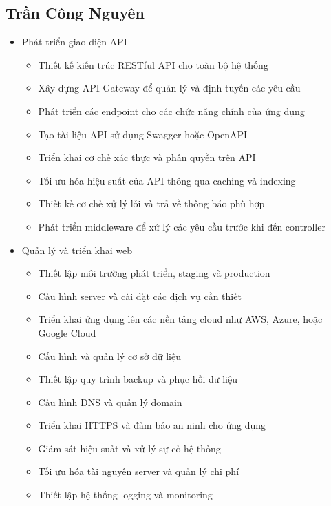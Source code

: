 \subsection{Trần Công Nguyên}
\begin{itemize}
    \item Phát triển giao diện API
    \begin{itemize}
        \item Thiết kế kiến trúc RESTful API cho toàn bộ hệ thống
        \item Xây dựng API Gateway để quản lý và định tuyến các yêu cầu
        \item Phát triển các endpoint cho các chức năng chính của ứng dụng
        \item Tạo tài liệu API sử dụng Swagger hoặc OpenAPI
        \item Triển khai cơ chế xác thực và phân quyền trên API
        \item Tối ưu hóa hiệu suất của API thông qua caching và indexing
        \item Thiết kế cơ chế xử lý lỗi và trả về thông báo phù hợp
        \item Phát triển middleware để xử lý các yêu cầu trước khi đến controller
    \end{itemize}
    
    \item Quản lý và triển khai web
    \begin{itemize}
        \item Thiết lập môi trường phát triển, staging và production
        \item Cấu hình server và cài đặt các dịch vụ cần thiết
        \item Triển khai ứng dụng lên các nền tảng cloud như AWS, Azure, hoặc Google Cloud
        \item Cấu hình và quản lý cơ sở dữ liệu
        \item Thiết lập quy trình backup và phục hồi dữ liệu
        \item Cấu hình DNS và quản lý domain
        \item Triển khai HTTPS và đảm bảo an ninh cho ứng dụng
        \item Giám sát hiệu suất và xử lý sự cố hệ thống
        \item Tối ưu hóa tài nguyên server và quản lý chi phí
        \item Thiết lập hệ thống logging và monitoring
    \end{itemize}
    

\end{itemize}
